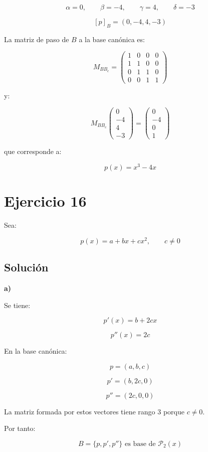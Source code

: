 \documentclass[11pt,a4paper]{article}
\newcommand{\Pn}{\mathcal{P}}
\begin{document}
	\[
	\alpha=0,
	\qquad
	\beta=-4,
	\qquad
	\gamma=4,
	\qquad
	\delta=-3
	\]

	\[
	\boxed{
	[p]_B=(0,-4,4,-3)
	}
	\]

	La matriz de paso de $B$ a la base canónica es:

	\[
	M_{BB_c}
	=
	\begin{pmatrix}
	1&0&0&0\\
	1&1&0&0\\
	0&1&1&0\\
	0&0&1&1
	\end{pmatrix}
	\]

	y:

	\[
	M_{BB_c}
	\begin{pmatrix}
	0\\-4\\4\\-3
	\end{pmatrix}
	=
	\begin{pmatrix}
	0\\-4\\0\\1
	\end{pmatrix}
	\]

	que corresponde a:

	\[
	\boxed{
	p(x)=x^3-4x
	}
	\]

\section{Ejercicio 16}
	Sea:

	\[
	p(x)=a+bx+cx^2,
	\qquad
	c\neq0
	\]

	\subsection{Solución}

	\textbf{a)}

	Se tiene:

	\[
	p'(x)=b+2cx
	\]

	\[
	p''(x)=2c
	\]

	En la base canónica:

	\[
	p=(a,b,c)
	\]

	\[
	p'=(b,2c,0)
	\]

	\[
	p''=(2c,0,0)
	\]

	La matriz formada por estos vectores tiene rango $3$ porque $c\neq0$.

	Por tanto:

	\[
	\boxed{
	B=\{p,p',p''\}\text{ es base de }\Pn_2(x)
	}
	\]
\end{document}
